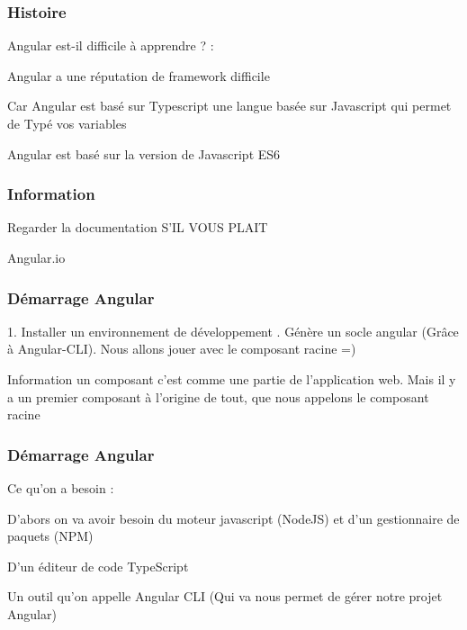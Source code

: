 \documentclass[10pt]{beamer}
\begin{document}
	\begin{frame}
		\frametitle{Histoire}

		Angular est-il difficile à apprendre ? : \newline \newline

		Angular a une réputation de framework difficile \newline \newline

		Car Angular est basé sur Typescript une langue basée sur Javascript qui permet de Typé vos variables \newline \newline

		Angular est basé sur la version de Javascript ES6

	\end{frame}

	\begin{frame}
		\frametitle{Information}
		\centering
		Regarder la documentation
		S'IL VOUS PLAIT

		Angular.io

	\end{frame}


	\begin{frame}
		\frametitle{Démarrage Angular}

		1. Installer un environnement de développement . Génère un socle angular (Grâce à Angular-CLI). Nous allons jouer avec le composant racine =)
		\newline \newline
		\begin{block}{Information}
			un composant c’est comme une partie de l’application web. Mais il y a un premier composant à l'origine de tout, que nous appelons le composant racine
		\end{block}

	\end{frame}

	\begin{frame}
		\frametitle{Démarrage Angular}

		Ce qu'on a besoin : \newline \newline

		D'abors on va avoir besoin du moteur javascript (NodeJS) et d'un gestionnaire de paquets (NPM) \newline \newline

		D'un éditeur de code TypeScript \newline \newline

		Un outil qu'on appelle Angular CLI (Qui va nous permet de gérer notre projet Angular)

	\end{frame}
\end{document}
